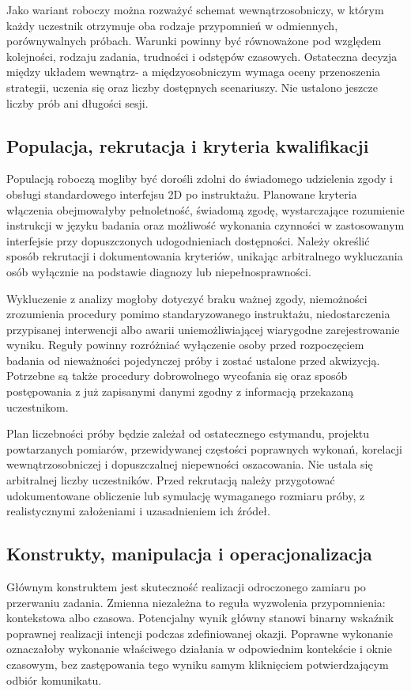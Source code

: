 \documentclass[11pt,a4paper]{article}
\begin{document}
Jako wariant roboczy można rozważyć schemat wewnątrzosobniczy, w którym każdy uczestnik otrzymuje oba rodzaje przypomnień w odmiennych, porównywalnych próbach. Warunki powinny być równoważone pod względem kolejności, rodzaju zadania, trudności i odstępów czasowych. Ostateczna decyzja między układem wewnątrz- a międzyosobniczym wymaga oceny przenoszenia strategii, uczenia się oraz liczby dostępnych scenariuszy. Nie ustalono jeszcze liczby prób ani długości sesji.

\subsection{Populacja, rekrutacja i kryteria kwalifikacji}
Populacją roboczą mogliby być dorośli zdolni do świadomego udzielenia zgody i obsługi standardowego interfejsu 2D po instruktażu. Planowane kryteria włączenia obejmowałyby pełnoletność, świadomą zgodę, wystarczające rozumienie instrukcji w języku badania oraz możliwość wykonania czynności w zastosowanym interfejsie przy dopuszczonych udogodnieniach dostępności. Należy określić sposób rekrutacji i dokumentowania kryteriów, unikając arbitralnego wykluczania osób wyłącznie na podstawie diagnozy lub niepełnosprawności.

Wykluczenie z analizy mogłoby dotyczyć braku ważnej zgody, niemożności zrozumienia procedury pomimo standaryzowanego instruktażu, niedostarczenia przypisanej interwencji albo awarii uniemożliwiającej wiarygodne zarejestrowanie wyniku. Reguły powinny rozróżniać wyłączenie osoby przed rozpoczęciem badania od nieważności pojedynczej próby i zostać ustalone przed akwizycją. Potrzebne są także procedury dobrowolnego wycofania się oraz sposób postępowania z już zapisanymi danymi zgodny z informacją przekazaną uczestnikom.

Plan liczebności próby będzie zależał od ostatecznego estymandu, projektu powtarzanych pomiarów, przewidywanej częstości poprawnych wykonań, korelacji wewnątrzosobniczej i dopuszczalnej niepewności oszacowania. Nie ustala się arbitralnej liczby uczestników. Przed rekrutacją należy przygotować udokumentowane obliczenie lub symulację wymaganego rozmiaru próby, z realistycznymi założeniami i uzasadnieniem ich źródeł.

\subsection{Konstrukty, manipulacja i operacjonalizacja}
Głównym konstruktem jest skuteczność realizacji odroczonego zamiaru po przerwaniu zadania. Zmienna niezależna to reguła wyzwolenia przypomnienia: kontekstowa albo czasowa. Potencjalny wynik główny stanowi binarny wskaźnik poprawnej realizacji intencji podczas zdefiniowanej okazji. Poprawne wykonanie oznaczałoby wykonanie właściwego działania w odpowiednim kontekście i oknie czasowym, bez zastępowania tego wyniku samym kliknięciem potwierdzającym odbiór komunikatu.
\end{document}
